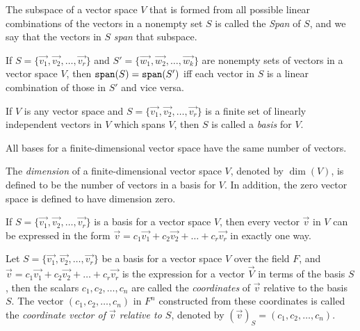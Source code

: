 \documentclass{report}
\begin{document}
		\begin{defn}[Span]
			The subspace of a vector space $V$ that is formed from all possible linear combinations of the vectors in a nonempty set $S$ is called the \emph{Span} of $S$, and we say that the vectors in $S$ \emph{span} that subspace.
		\end{defn}
	
		\begin{thm}
			If $S=\{\vec{v_1}, \vec{v_2}, \dots, \vec{v_r}\}$ and $S'=\{\vec{w_1}, \vec{w_2}, \dots, \vec{w_k}\}$ are nonempty sets of vectors in a vector space $V$, then $\verb|span|(S)=\verb|span|(S')$ iff each vector in $S$ is a linear combination of those in $S'$ and vice versa.
		\end{thm}

		\begin{defn}[Basis]\label{def_basis}
			If $V$ is any vector space and $S=\{\vec{v_1}, \vec{v_2}, \dots, \vec{v_r}\}$ is a finite set of linearly independent vectors in $V$ which spans $V$, then $S$ is called a \emph{basis} for $V$.
		\end{defn}
	
		\begin{thm}
			All bases for a finite-dimensional vector space have the same number of vectors.
		\end{thm}
		
		\begin{defn}[Dimension]
			The \emph{dimension} of a finite-dimensional vector space $V$, denoted by $\dim (V)$, is defined to be the number of vectors in a basis for $V$. In addition, the zero vector space is defined to have dimension zero.
		\end{defn}
	
		\begin{thm}\label{thm_coordinate_unique}
			If $S=\{\vec{v_1}, \vec{v_2}, \dots, \vec{v_r}\}$ is a basis for a vector space $V$, then every vector $\vec{v}$ in $V$ can be expressed in the form $\vec{v}=c_1\vec{v_1}+c_2\vec{v_2}+\dots+c_r\vec{v_r}$ in exactly one way.
		\end{thm}
	
		\begin{defn}[Coordinate]\label{def_coordinate}
			Let $S=\{\vec{v_1}, \vec{v_2}, \dots, \vec{v_r}\}$ be a basis for a vector space $V$ over the field $F$, and $\vec{v}=c_1\vec{v_1}+c_2\vec{v_2}+\dots+c_r\vec{v_r}$ is the expression for a vector $\vec{V}$ in terms of the basis $S$, then the scalars $c_1,c_2,\dots,c_n$ are called the \emph{coordinates} of $\vec{v}$ relative to the basis $S$. The vector $(c_1,c_2,\dots,c_n)$ in $F^n$ constructed from these coordinates is called the \emph{coordinate vector of $\vec{v}$ relative to $S$}, denoted by $(\vec{v})_S=(c_1,c_2,\dots,c_n)$.
		\end{defn}
\end{document}

